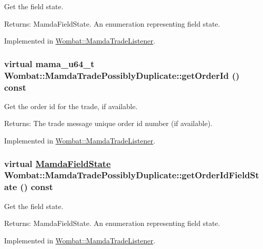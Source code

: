 Get the field state. 

\begin{Desc}
\item[Returns:]Mamda\-Field\-State. An enumeration representing field state. \end{Desc}


Implemented in \hyperlink{classWombat_1_1MamdaTradeListener_f8e874c8dc039fb83f1e9f4a8bdcbc6f}{Wombat::Mamda\-Trade\-Listener}.\hypertarget{classWombat_1_1MamdaTradePossiblyDuplicate_8df1610925e943b7d585993e0f4192a9}{
\subsubsection[getOrderId]{\setlength{\rightskip}{0pt plus 5cm}virtual mama\_\-u64\_\-t Wombat::Mamda\-Trade\-Possibly\-Duplicate::get\-Order\-Id () const}}
\label{classWombat_1_1MamdaTradePossiblyDuplicate_8df1610925e943b7d585993e0f4192a9}


Get the order id for the trade, if available. 

\begin{Desc}
\item[Returns:]The trade message unique order id number (if available). \end{Desc}


Implemented in \hyperlink{classWombat_1_1MamdaTradeListener_46c9913f3bc9f7e31f07afa76eaed7ff}{Wombat::Mamda\-Trade\-Listener}.\hypertarget{classWombat_1_1MamdaTradePossiblyDuplicate_84a85c0772c805d3c0fa9f8ae5cb1a67}{
\subsubsection[getOrderIdFieldState]{\setlength{\rightskip}{0pt plus 5cm}virtual \hyperlink{namespaceWombat_93aac974f2ab713554fd12a1fa3b7d2a}{Mamda\-Field\-State} Wombat::Mamda\-Trade\-Possibly\-Duplicate::get\-Order\-Id\-Field\-State () const}}
\label{classWombat_1_1MamdaTradePossiblyDuplicate_84a85c0772c805d3c0fa9f8ae5cb1a67}


Get the field state. 

\begin{Desc}
\item[Returns:]Mamda\-Field\-State. An enumeration representing field state. \end{Desc}


Implemented in \hyperlink{classWombat_1_1MamdaTradeListener_f0f77145439c12c8bae3640307b50401}{Wombat::Mamda\-Trade\-Listener}.